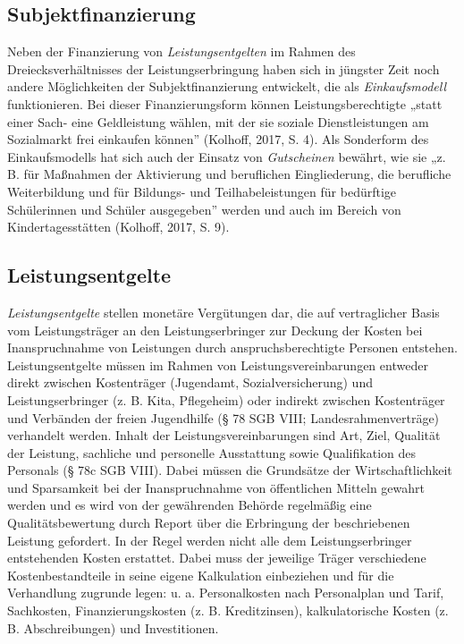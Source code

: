 \documentclass[
  letterpaper,
]{book}
\begin{document}
\subsection{Subjektfinanzierung}\label{subjektfinanzierung}

Neben der Finanzierung von \emph{Leistungsentgelten} im Rahmen des
Dreiecksverhältnisses der Leistungserbringung haben sich in jüngster
Zeit noch andere Möglichkeiten der Subjektfinanzierung entwickelt, die
als \emph{Einkaufsmodell} funktionieren. Bei dieser Finanzierungsform
können Leistungsberechtigte „statt einer Sach- eine Geldleistung wählen,
mit der sie soziale Dienstleistungen am Sozialmarkt frei einkaufen
können'' (Kolhoff, 2017, S. 4). Als Sonderform des Einkaufsmodells hat
sich auch der Einsatz von \emph{Gutscheinen} bewährt, wie sie „z. B. für
Maßnahmen der Aktivierung und beruflichen Eingliederung, die berufliche
Weiterbildung und für Bildungs- und Teilhabeleistungen für bedürftige
Schülerinnen und Schüler ausgegeben'' werden und auch im Bereich von
Kindertagesstätten (Kolhoff, 2017, S. 9).

\subsection{Leistungsentgelte}\label{leistungsentgelte}

\emph{Leistungsentgelte} stellen monetäre Vergütungen dar, die auf
vertraglicher Basis vom Leistungsträger an den Leistungserbringer zur
Deckung der Kosten bei Inanspruchnahme von Leistungen durch
anspruchsberechtigte Personen entstehen. Leistungsentgelte müssen im
Rahmen von Leistungsvereinbarungen entweder direkt zwischen Kostenträger
(Jugendamt, Sozialversicherung) und Leistungserbringer (z. B. Kita,
Pflegeheim) oder indirekt zwischen Kostenträger und Verbänden der freien
Jugendhilfe (§ 78 SGB VIII; Landesrahmenverträge) verhandelt werden.
Inhalt der Leistungsvereinbarungen sind Art, Ziel, Qualität der
Leistung, sachliche und personelle Ausstattung sowie Qualifikation des
Personals (§ 78c SGB VIII). Dabei müssen die Grundsätze der
Wirtschaftlichkeit und Sparsamkeit bei der Inanspruchnahme von
öffentlichen Mitteln gewahrt werden und es wird von der gewährenden
Behörde regelmäßig eine Qualitätsbewertung durch Report über die
Erbringung der beschriebenen Leistung gefordert. In der Regel werden
nicht alle dem Leistungserbringer entstehenden Kosten erstattet. Dabei
muss der jeweilige Träger verschiedene Kostenbestandteile in seine
eigene Kalkulation einbeziehen und für die Verhandlung zugrunde legen:
u. a. Personalkosten nach Personalplan und Tarif, Sachkosten,
Finanzierungskosten (z. B. Kreditzinsen), kalkulatorische Kosten (z. B.
Abschreibungen) und Investitionen.
\end{document}

